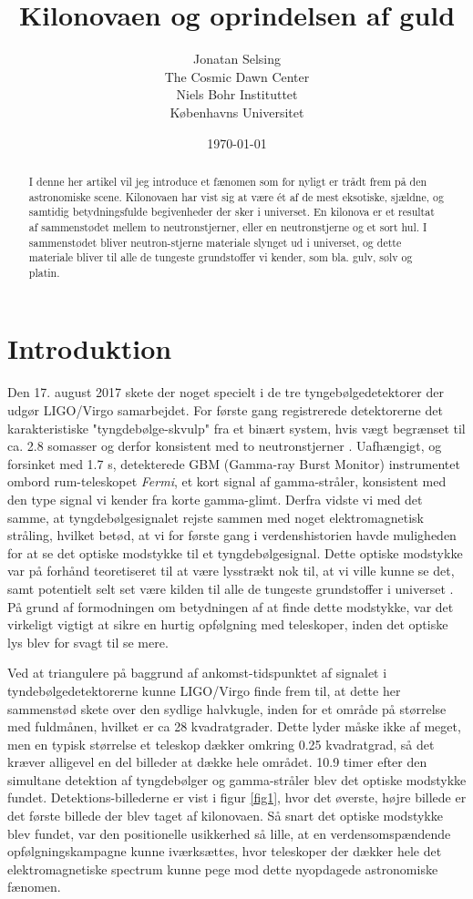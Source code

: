 \documentclass[twocolumn]{article}
\title{Kilonovaen og oprindelsen af guld}
\author{Jonatan Selsing \\
	The Cosmic Dawn Center \\
	 Niels Bohr Instituttet  \\
	 Københavns Universitet \\
	}
\date{\today}
\begin{document}
\maketitle


\begin{abstract}
I denne her artikel vil jeg introduce et fænomen som for nyligt er trådt frem på den astronomiske scene. Kilonovaen har vist sig at være ét af de mest eksotiske, sjældne, og samtidig betydningsfulde begivenheder der sker i universet. En kilonova er et resultat af sammenstødet mellem to neutronstjerner, eller en neutronstjerne og et sort hul. I sammenstødet bliver neutron-stjerne materiale slynget ud i universet, og dette materiale bliver til alle de tungeste grundstoffer vi kender, som bla. gulv, sølv og platin. 
\end{abstract}

\section{Introduktion}
Den 17. august 2017 skete der noget specielt i de tre tyngebølgedetektorer der udgør LIGO/Virgo samarbejdet. For første gang registrerede detektorerne det karakteristiske "tyngdebølge-skvulp" fra et binært system, hvis vægt begrænset til ca. 2.8 somasser og derfor konsistent med to neutronstjerner \cite{abbotta}. Uafhængigt, og forsinket med 1.7 s, detekterede GBM (Gamma-ray Burst Monitor) instrumentet ombord rum-teleskopet \textit{Fermi}, et kort signal af gamma-stråler, konsistent med den type signal vi kender fra korte gamma-glimt. Derfra vidste vi med det samme, at tyngdebølgesignalet rejste sammen med noget elektromagnetisk stråling, hvilket betød, at vi for første gang i verdenshistorien havde muligheden for at se det optiske modstykke til et tyngdebølgesignal. Dette optiske modstykke var på forhånd teoretiseret til at være lysstrækt nok til, at vi ville kunne se det, samt potentielt selt set være kilden til alle de tungeste grundstoffer i universet \cite{lattimer}. På grund af formodningen om betydningen af at finde dette modstykke, var det virkeligt vigtigt at sikre en hurtig opfølgning med teleskoper, inden det optiske lys blev for svagt til se mere. 

Ved at triangulere på baggrund af ankomst-tidspunktet af signalet i tyndebølgedetektorerne kunne LIGO/Virgo finde frem til, at dette her sammenstød skete over den sydlige halvkugle, inden for et område på størrelse med fuldmånen, hvilket er ca 28 kvadratgrader. Dette lyder måske ikke af meget, men en typisk størrelse et teleskop dækker omkring 0.25 kvadratgrad, så det kræver alligevel en del billeder at dække hele området. 10.9 timer efter den simultane detektion af tyngdebølger og gamma-stråler blev det optiske modstykke fundet. Detektions-billederne er vist i figur \ref{fig1}, hvor det øverste, højre billede er det første billede der blev taget af kilonovaen. Så snart det optiske modstykke blev fundet, var den positionelle usikkerhed så lille, at en verdensomspændende opfølgningskampagne kunne iværksættes, hvor teleskoper der dækker hele det elektromagnetiske spectrum kunne pege mod dette nyopdagede astronomiske fænomen.
\end{document}
